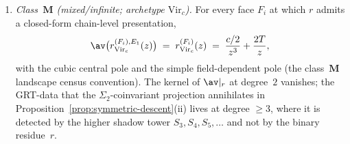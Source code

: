 \begin{proposition}
\begin{enumerate}[label=\textup{(\roman*)}]
 For every face $F_i$,
 \[
 \av\bigl(r_{\beta\gamma}^{(F_i),E_1}(z)\bigr) \;=\;
 r_{\beta\gamma}^{(F_i)}(z) \;=\; 0,
 \]
 the residue is zero on every face. The non-trivial datum
 is carried by the higher shadow $r_{\max}(\beta\gamma) = 4$
 component of the obstruction tower
 (Theorem~\ref{thm:genus-universality}, class~$\mathbf{C}$
 entry); $\av$ is compatible with the higher-shadow projection
 face by face by the same coinvariant argument.
\item \emph{Class~$\mathbf{M}$ (mixed/infinite; archetype
 $\mathrm{Vir}_c$).} For every face $F_i$ at which $r$ admits
 a closed-form chain-level presentation,
 \[
 \av\bigl(r_{\mathrm{Vir}_c}^{(F_i),E_1}(z)\bigr) \;=\;
 r_{\mathrm{Vir}_c}^{(F_i)}(z) \;=\;
 \frac{c/2}{z^3} + \frac{2T}{z},
 \]
 with the cubic central pole and the simple field-dependent pole
 (the class~$\mathbf{M}$ landscape census convention). The kernel of
 $\av|_r$ at degree~$2$ vanishes; the
 GRT-data that the $\Sigma_2$-coinvariant projection annihilates
 in Proposition~\ref{prop:symmetric-descent}(ii) lives at degree
 $\geq 3$, where it is detected by the higher shadow tower
 $S_3, S_4, S_5, \dots$ and not by the binary residue~$r$.
\end{enumerate}
\end{proposition}

